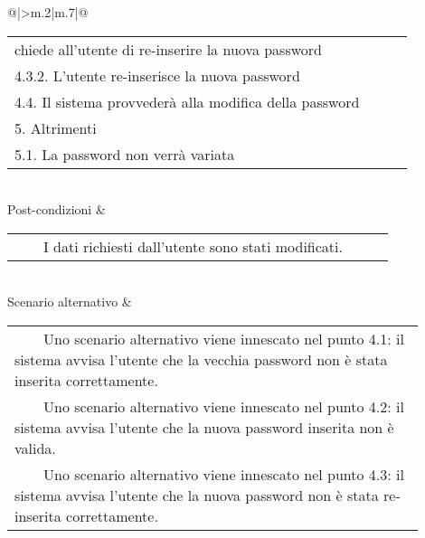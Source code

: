\begin{table}[H]
\begin{longtable}{@{}|>{\centering\arraybackslash}m{.2\textwidth}|m{.7\textwidth}|@{}}
\begin{tabular}{m{0.9\linewidth}}
		chiede all'utente di re-inserire la nuova 
		password\\\hspace{1.0cm}\hspace{0.5cm}\hspace{0.0cm}4.3.2. L'utente 
		re-inserisce la nuova password\\\hspace{0.5cm}\hspace{0.0cm}4.4. Il 
		sistema provvederà alla modifica della password\\\hspace{0.0cm}5. 
		Altrimenti\\\hspace{0.5cm}\hspace{0.0cm}5.1. La password non verrà 
		variata\\\end{tabular}\\
		Post-condizioni & \begin{tabular}{m{0.9\linewidth}}~~\llap{\textbullet}~~I dati richiesti dall'utente sono stati modificati.\\\end{tabular}\\
		Scenario alternativo & \begin{tabular}{m{0.9\linewidth}}~~\llap{\textbullet}~~Uno scenario alternativo viene innescato nel punto 4.1: il sistema avvisa l'utente che la vecchia password non è stata inserita correttamente.\\~~\llap{\textbullet}~~Uno scenario alternativo viene innescato nel punto 4.2: il sistema avvisa l'utente che la nuova password inserita non è valida.\\~~\llap{\textbullet}~~Uno scenario alternativo viene innescato nel punto 4.3: il sistema avvisa l'utente che la nuova password non è stata re-inserita correttamente.\\\end{tabular}\\\hline
		
	\end{longtable}
\end{table}

